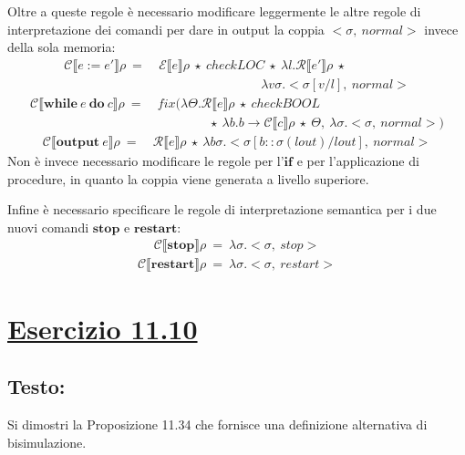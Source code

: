\documentclass[a4paper,twosides]{report}
\newcommand{\sectionline}{
  \begin{center}
    \resizebox{0.5\linewidth}{5ex}{
      \hyperref[toc]{
        \begin{tikzpicture}
          \node  (C) at (0,0) {};
          \node (D) at (10,0) {};
          \path (C) to [ornament=84] (D);
        \end{tikzpicture}
      }
    }
  \end{center}
}
\begin{document}
Oltre a queste regole \`e necessario modificare leggermente le altre regole
di interpretazione dei comandi per dare in output la coppia $<\sigma,\
normal>$ invece della sola memoria:
\begin{align*}
  \mathcal{C}\llbracket e:=e'\rrbracket\rho\ =\ &\mathcal{E}\llbracket
  e\rrbracket\rho\ \star\ checkLOC\ \star\ \lambda
  l.\mathcal{R}\llbracket e'\rrbracket\rho\ \star\\
  &\qquad\qquad\qquad\qquad\lambda
  v\sigma.<\sigma[v/l],\ normal>
\end{align*}
\begin{align*}
  \mathcal{C}\llbracket\mathbf{while}\ e\ \mathbf{do}\ c\rrbracket\rho\
  =\ &fix(\lambda\Theta.\mathcal{R}\llbracket e\rrbracket\rho\ \star\
  checkBOOL\\
  &\qquad\qquad\star\ \lambda b.b\rightarrow\mathcal{C}\llbracket
  c\rrbracket\rho\ \star\ \Theta,\ \lambda\sigma.<\sigma,\ normal>)
\end{align*}
\begin{align*}
  \mathcal{C}\llbracket\mathbf{output}\ e\rrbracket\rho\ =\ 
  &\mathcal{R}\llbracket e\rrbracket\rho\ \star\ \lambda
  b\sigma.<\sigma[b::\sigma(lout)/lout],\ normal>
\end{align*}
Non \`e invece necessario modificare le regole per l'$\mathbf{if}$ e
per l'applicazione di procedure, in quanto la coppia viene generata a
livello superiore.

Infine \`e necessario specificare le regole di interpretazione
semantica per i due nuovi comandi $\mathbf{stop}$ e
$\mathbf{restart}$:
\begin{align*}
  \mathcal{C}\llbracket\mathbf{stop}\rrbracket\rho\ =\
  \lambda\sigma.<\sigma,\ stop>
\end{align*}
\begin{align*}
  \mathcal{C}\llbracket\mathbf{restart}\rrbracket\rho\ =\
  \lambda\sigma.<\sigma,\ restart>
\end{align*}

\sectionline
\section*{\hyperref[toc]{Esercizio 11.10}}
\subsection*{Testo:}
Si dimostri la Proposizione 11.34 che fornisce una definizione
alternativa di bisimulazione.
\end{document}
